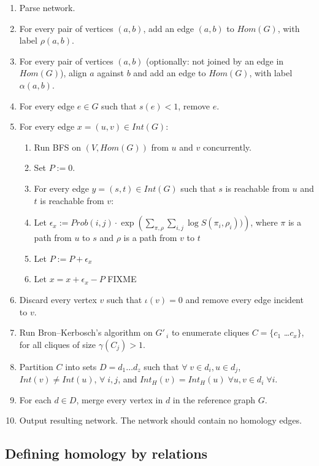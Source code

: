 \documentclass[11pt]{article}
\begin{document}
\begin{enumerate}
\item Parse network.
\item For every pair of vertices $(a,b)$, add an edge $(a,b)$ to $Hom(G)$, with label $\rho(a,b)$.
\item For every pair of vertices $(a,b)$ (optionally: not joined by an edge in $Hom(G)$), align $a$ against $b$ and add an edge to $Hom(G)$, with label $\alpha(a,b)$.
\item For every edge $e \in G$ such that $s(e) < 1$, remove $e$.
\item For every edge $x=(u,v) \in Int(G)$:
\begin{enumerate}
\item Run BFS on $(V, Hom(G))$ from $u$ and $v$ concurrently.
\item Set $P := 0$.
\item For every edge $y=(s,t) \in Int(G)$ such that $s$ is reachable from $u$ and $t$ is reachable from $v$:
\item Let $\epsilon_x := Prob(i,j) \cdot \exp \left( \displaystyle \sum_{\pi, \rho} \sum_{i,j} \log S(\pi_i, \rho_i)) \right)$, where $\pi$ is a path from $u$ to $s$ and $\rho$ is a path from $v$ to $t$
\item Let $P := P + \epsilon_x$
\item Let $x = x + \epsilon_x - P$ FIXME
\end{enumerate}
\item Discard every vertex $v$ such that $\iota(v) = 0$ and remove every edge incident to $v$.
\item Run Bron--Kerbosch's algorithm on $G'\,\!_i$ to enumerate cliques $C = \{ c_1$ \ldots $c_x \}$, for all cliques of size $\gamma(C_j) > 1$.
\item Partition $C$ into sets $D = d_1 \ldots d_z$ such that $\forall \; v \in d_i, u \in d_j$, $Int(v) \neq Int(u)$, $\forall \; i,j$, and $Int_H(v) = Int_H(u) \; \forall u,v \in d_i \; \forall i$.
\item For each $d \in D$, merge every vertex in $d$ in the reference graph $G$.
\item Output resulting network. The network should contain no homology edges.
\end{enumerate}

\subsection*{Defining homology by relations}
\end{document}
